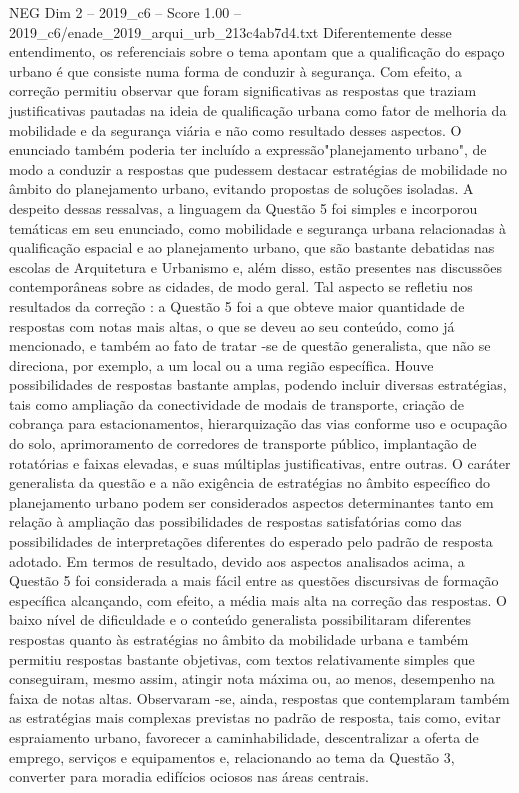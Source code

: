 \begin{textsample}{NEG Dim 2 – 2019\_c6 – Score 1.00 – 2019\_c6/enade\_2019\_arqui\_urb\_213c4ab7d4.txt}
Diferentemente desse entendimento, os referenciais sobre o tema apontam que a qualificação do espaço urbano é que consiste numa forma de conduzir à segurança.
Com efeito, a correção permitiu observar que foram significativas as respostas que traziam justificativas pautadas na ideia de qualificação urbana como fator de melhoria da mobilidade e da segurança viária e não como resultado desses aspectos.
O enunciado também poderia ter incluído a expressão"planejamento urbano", de modo a conduzir a respostas que pudessem destacar estratégias de mobilidade no âmbito do planejamento urbano, evitando propostas de soluções isoladas.
A despeito dessas ressalvas, a linguagem da Questão 5 foi simples e incorporou temáticas em seu enunciado, como mobilidade e segurança urbana relacionadas à qualificação espacial e ao planejamento urbano, que são bastante debatidas nas escolas de Arquitetura e Urbanismo e, além disso, estão presentes nas discussões contemporâneas sobre as cidades, de modo geral.
Tal aspecto se refletiu nos resultados da correção : a Questão 5 foi a que obteve maior quantidade de respostas com notas mais altas, o que se deveu ao seu conteúdo, como já mencionado, e também ao fato de tratar -se de questão generalista, que não se direciona, por exemplo, a um local ou a uma região específica.
Houve possibilidades de respostas bastante amplas, podendo incluir diversas estratégias, tais como ampliação da conectividade de modais de transporte, criação de cobrança para estacionamentos, hierarquização das vias conforme uso e ocupação do solo, aprimoramento de corredores de transporte público, implantação de rotatórias e faixas elevadas, e suas múltiplas justificativas, entre outras.
O caráter generalista da questão e a não exigência de estratégias no âmbito específico do planejamento urbano podem ser considerados aspectos determinantes tanto em relação à ampliação das possibilidades de respostas satisfatórias como das possibilidades de interpretações diferentes do esperado pelo padrão de resposta adotado.
Em termos de resultado, devido aos aspectos analisados acima, a Questão 5 foi considerada a mais fácil entre as questões discursivas de formação específica alcançando, com efeito, a média mais alta na correção das respostas.
O baixo nível de dificuldade e o conteúdo generalista possibilitaram diferentes respostas quanto às estratégias no âmbito da mobilidade urbana e também permitiu respostas bastante objetivas, com textos relativamente simples que conseguiram, mesmo assim, atingir nota máxima ou, ao menos, desempenho na faixa de notas altas.
Observaram -se, ainda, respostas que contemplaram também as estratégias mais complexas previstas no padrão de resposta, tais como, evitar espraiamento urbano, favorecer a caminhabilidade, descentralizar a oferta de emprego, serviços e equipamentos e, relacionando ao tema da Questão 3, converter para moradia edifícios ociosos nas áreas centrais.

\end{textsample}

